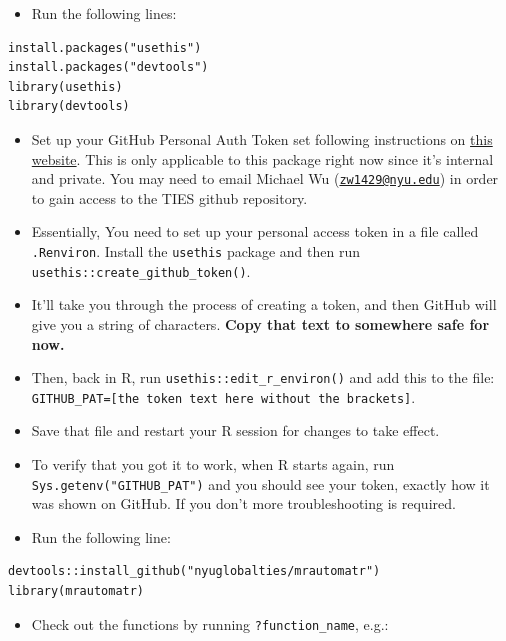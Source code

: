 \documentclass[
]{book}
\providecommand{\tightlist}{%
  \setlength{\itemsep}{0pt}\setlength{\parskip}{0pt}}
\begin{document}
\begin{itemize}
\tightlist
\item
  Run the following lines:
\end{itemize}

\begin{verbatim}
install.packages("usethis")
install.packages("devtools")
library(usethis)
library(devtools)
\end{verbatim}

\begin{itemize}
\item
  Set up your GitHub Personal Auth Token set following instructions on \href{https://usethis.r-lib.org/reference/browse_github_pat.html}{this website}. This is only applicable to this package right now since it's internal and private. You may need to email Michael Wu (\href{mailto:zw1429@nyu.edu}{\nolinkurl{zw1429@nyu.edu}}) in order to gain access to the TIES github repository.
\item
  Essentially, You need to set up your personal access token in a file called \texttt{.Renviron}. Install the \texttt{usethis} package and then run \texttt{usethis::create\_github\_token()}.
\item
  It'll take you through the process of creating a token, and then GitHub will give you a string of characters. \textbf{Copy that text to somewhere safe for now.}
\item
  Then, back in R, run \texttt{usethis::edit\_r\_environ()} and add this to the file: \texttt{GITHUB\_PAT={[}the\ token\ text\ here\ without\ the\ brackets{]}}.
\item
  Save that file and restart your R session for changes to take effect.
\item
  To verify that you got it to work, when R starts again, run \texttt{Sys.getenv("GITHUB\_PAT")} and you should see your token, exactly how it was shown on GitHub. If you don't more troubleshooting is required.
\item
  Run the following line:
\end{itemize}

\begin{verbatim}
devtools::install_github("nyuglobalties/mrautomatr")
library(mrautomatr)
\end{verbatim}

\begin{itemize}
\tightlist
\item
  Check out the functions by running \texttt{?function\_name}, e.g.:
\end{itemize}
\end{document}
